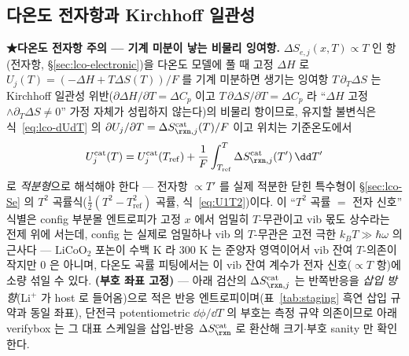 \subsection{다온도 전자항과 Kirchhoff 일관성}\label{sec:lco-center-kirchhoff}
\textbf{★다온도 전자항 주의 --- 기계 미분이 낳는 비물리 잉여항.} $\Delta S_{e,j}(x,T)\propto T$
인 항(전자항, \S\ref{sec:lco-electronic})을 다온도 모델에 풀 때 고정 $\Delta H$ 로 $U_j(T)=(-\Delta H+T\Delta S(T))/F$ 를 기계 미분하면 생기는
잉여항 $T\,\partial_T\Delta S$ 는 Kirchhoff 일관성 위반($\partial\Delta H/\partial T=\Delta C_p$ 이고
$T\,\partial\Delta S/\partial T=\Delta C_p$ 라 ``$\Delta H$ 고정$\wedge\partial_T\Delta S\ne0$'' 가정 자체가
성립하지 않는다)의 비물리 항이므로, 유지할 불변식은 식~\eqref{eq:lco-dUdT} 의
$\partial U_j/\partial T=\Delta S_{\rxn,j}^\mathrm{cat}(T)/F$ 이고 위치는 기준온도에서
\begin{equation}
U_j^\mathrm{cat}(T)=U_j^\mathrm{cat}(T_\mathrm{ref})+\frac1F\int_{T_\mathrm{ref}}^{T}\Delta S_{\rxn,j}^\mathrm{cat}(T')\,\dd T'
\label{eq:lco-kirchhoff}
\end{equation}
로 \emph{적분형}으로 해석해야 한다 --- 전자항 $\propto T'$ 를 실제 적분한 닫힌 특수형이 \S\ref{sec:lco-Se} 의
$T^2$ 곡률식($\tfrac12(T^2-T_\mathrm{ref}^2)$ 곡률, 식~\eqref{eq:U1T2})이다. 이 ``$T^2$ 곡률 $=$ 전자 신호'' 식별은 config 부분몰 엔트로피가
고정 $x$ 에서 엄밀히 $T$-무관이고 vib 몫도 상수라는 전제 위에 서는데, config 는 실제로 엄밀하나 vib 의 $T$-무관은
고전 극한 $k_BT\gg\hbar\omega$ 의 근사다 --- $\mathrm{LiCoO_2}$ 포논이 수백 K 라 $300$ K 는 준양자 영역이어서 vib 잔여
$T$-의존이 작지만 $0$ 은 아니며, 다온도 곡률 피팅에서는 이 vib 잔여 계수가 전자 신호($\propto T$ 항)에 소량 섞일 수 있다.
\textbf{(부호 좌표 고정)} --- 아래 검산의 $\Delta S_{\rxn,j}^\mathrm{cat}$ 는 반쪽반응을
\emph{삽입 방향}(Li$^+$ 가 host 로 들어옴)으로 적은 반응 엔트로피이며(표~\ref{tab:staging} 흑연 삽입 규약과
동일 좌표), 단전극 potentiometric $\dd\phi/\dd T$ 의 부호는 측정 규약 의존이므로 아래 verifybox 는 그
대표 스케일을 삽입-반응 $\Delta S_{\rxn}^\mathrm{cat}$ 로 환산해 크기$\cdot$부호 sanity 만 확인한다.

